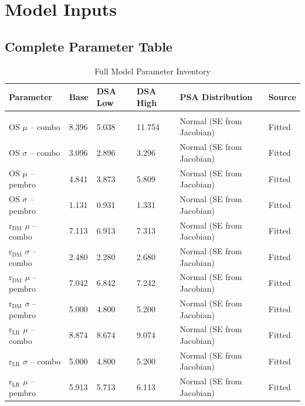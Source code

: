 \documentclass[11pt,a4paper]{article}
\begin{document}
\section{Model Inputs}
\label{sec:inputs}

\subsection{Complete Parameter Table}
\begin{landscape}
\begin{table}[p]
\centering
\caption{Full Model Parameter Inventory}
\label{tab:s8}
\footnotesize
\setlength{\tabcolsep}{4pt}
\renewcommand{\arraystretch}{0.95}
\begin{tabularx}{\linewidth}{@{}>{\raggedright\arraybackslash}Xlll>{\raggedright\arraybackslash}Xl@{}}
\toprule
\textbf{Parameter} & \textbf{Base} & \textbf{DSA Low} & \textbf{DSA High} & \textbf{PSA Distribution} & \textbf{Source} \\
\midrule
\multicolumn{6}{c}{\textit{Clinical Parameters}} \\
OS $\mu$ -- combo & 8.396 & 5.038 & 11.754 & Normal (SE from Jacobian) & Fitted \\
OS $\sigma$ -- combo & 3.096 & 2.896 & 3.296 & Normal (SE from Jacobian) & Fitted \\
OS $\mu$ -- pembro & 4.841 & 3.873 & 5.809 & Normal (SE from Jacobian) & Fitted \\
OS $\sigma$ -- pembro & 1.131 & 0.931 & 1.331 & Normal (SE from Jacobian) & Fitted \\
r$_{\text{DM}}$ $\mu$ -- combo & 7.113 & 6.913 & 7.313 & Normal (SE from Jacobian) & Fitted \\
r$_{\text{DM}}$ $\sigma$ -- combo & 2.480 & 2.280 & 2.680 & Normal (SE from Jacobian) & Fitted \\
r$_{\text{DM}}$ $\mu$ -- pembro & 7.042 & 6.842 & 7.242 & Normal (SE from Jacobian) & Fitted \\
r$_{\text{DM}}$ $\sigma$ -- pembro & 5.000 & 4.800 & 5.200 & Normal (SE from Jacobian) & Fitted \\
r$_{\text{LR}}$ $\mu$ -- combo & 8.874 & 8.674 & 9.074 & Normal (SE from Jacobian) & Fitted \\
r$_{\text{LR}}$ $\sigma$ -- combo & 5.000 & 4.800 & 5.200 & Normal (SE from Jacobian) & Fitted \\
r$_{\text{LR}}$ $\mu$ -- pembro & 5.913 & 5.713 & 6.113 & Normal (SE from Jacobian) & Fitted \\

\end{tabularx}
\end{table}
\end{landscape}
\end{document}

